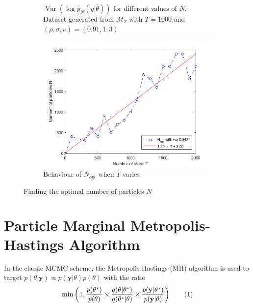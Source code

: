 \documentclass[11pt,a4,twosided,singlespacing,titlepagenumber=on]{scrreprt}
\numberwithin{equation}{chapter} %
\theoremstyle{remark}
\DeclareMathOperator{\var}{Var}
\newcommand{\matr}[1]{\mathbf{#1}}
\newcommand\numberthis{\addtocounter{equation}{1}\tag{\theequation}}
\begin{document}
\begin{figure}[H]
\begin{subfigure}[1b]{0.49\textwidth}
        \caption{$\var(\log \hat{p}_N(y|\bar{\theta}))$ for different values of $N$. Dataset generated from $\mathcal{M}_2$ with $T=1000$ and $(\rho,\sigma,\nu) = (0.91,1,3)$}
        \label{est_var_pn_theta_n}
    \end{subfigure}
    \begin{subfigure}[1b]{0.49\textwidth}
        \centering
        \includegraphics[width=1\textwidth]{n_opt_function_t}
        \caption{Behaviour of $N_{opt}$ when $T$ varies}
        \label{n_opt_function_t}
    \end{subfigure}
    \caption{Finding the optimal number of particles $N$}
\end{figure}

\section{Particle Marginal Metropolis-Hastings Algorithm}
\label{section:mcmc_pmmh}

In the classic MCMC scheme, the Metropolis Hastings (MH) algorithm is used to target $p(\theta| \matr{y}) \propto p(\matr{y}|\theta)p(\theta)$ with the ratio
\begin{align*}
\min \left( 1, \frac{p(\theta^\star)}{p(\theta)} \times  \frac{q(\theta|\theta^\star)}{q(\theta^\star|\theta)} \times \frac{p({\matr{y}}|\theta^\star)}{p({\matr{y}}|\theta)} \right) \numberthis \label{classic_mcmc_target}
\end{align*}
\end{document}
